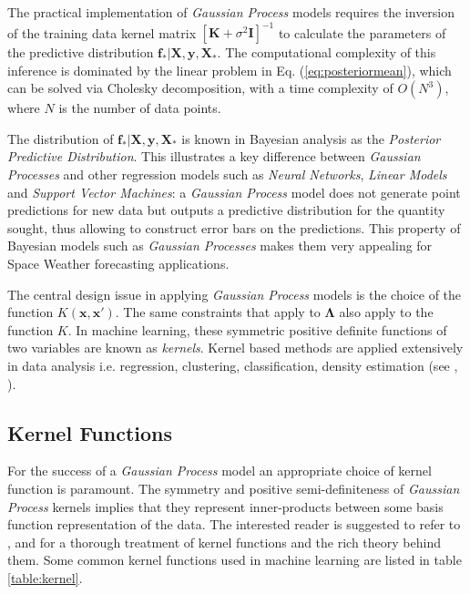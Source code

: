 \documentclass[sw, draft]{AGUTeX}
\begin{document}
\begin{article}
The practical implementation of \emph{Gaussian Process} models requires the inversion of the training data kernel matrix $[\mathbf{K} + \sigma^{2} \mathbf{I}]^{-1}$ to calculate the parameters of the predictive distribution $\mathbf{f_*}|\mathbf{X},\mathbf{y},\mathbf{X_*}$. The computational complexity of this inference is dominated by the linear problem in Eq. (\ref{eq:posteriormean}), which can be solved via Cholesky decomposition, with a time complexity of $O(N^3)$, where $N$ is the number of data points.

The distribution of $\mathbf{f_*}| \mathbf{X},\mathbf{y},\mathbf{X_*}$ is known in Bayesian analysis as the \emph{Posterior Predictive Distribution}. This illustrates a key difference between \emph{Gaussian Processes} and other regression models such as \emph{Neural Networks}, \emph{Linear Models} and \emph{Support Vector Machines}: a \emph{Gaussian Process} model does not generate point predictions for new data but outputs a predictive distribution for the quantity sought, thus allowing to construct error bars on the predictions. This property of Bayesian models such as \emph{Gaussian Processes} makes them very appealing for Space Weather forecasting applications. 

The central design issue in applying \emph{Gaussian Process} models is the choice of the function $K(\mathbf{x}, \mathbf{x}')$. The same constraints that apply to $\mathbf{\Lambda}$ also apply to the function $K$. In machine learning, these symmetric positive definite functions of two variables are known as \emph{kernels}. Kernel based methods are applied extensively in data analysis i.e. regression, clustering, classification, density estimation (see \citet{Scholkopf:2001:LKS:559923}, \citet{hofmann2008}).

\subsection{Kernel Functions}

For the success of a \emph{Gaussian Process} model an appropriate choice of kernel function is paramount. The symmetry and positive semi-definiteness of \emph{Gaussian Process} kernels implies that they represent inner-products between some basis function representation of the data. The interested reader is suggested to refer to \citet{Berlinet2004}, \citet{Scholkopf:2001:LKS:559923} and \citet{hofmann2008} for a thorough treatment of kernel functions and the rich theory behind them. Some common kernel functions used in machine learning are listed in table \ref{table:kernel}. 


\end{article}
\end{document}
